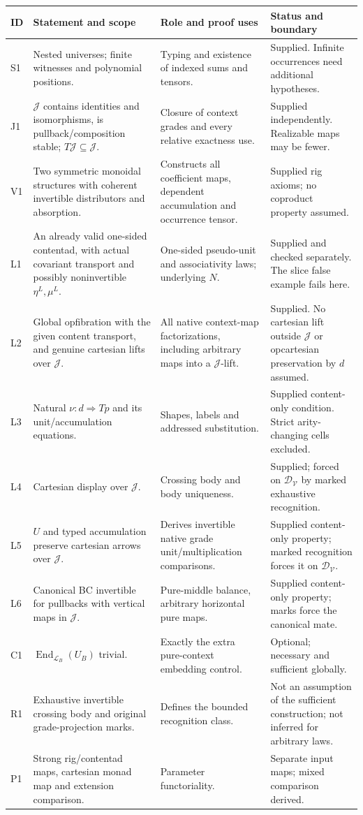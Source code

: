 \documentclass[11pt,a4paper]{article}
\theoremstyle{definition}
\newcommand{\V}{\mathcal V}
\newcommand{\Lcat}{\mathcal L}
\newcommand{\J}{\mathcal J}
\newcommand{\D}{\mathcal D_{\V}}
\newcommand{\End}{\operatorname{End}}
\begin{document}
\begin{longtable}{@{}p{.08\linewidth}p{.37\linewidth}p{.27\linewidth}p{.20\linewidth}@{}}
\toprule
ID&Statement and scope&Role and proof uses&Status and boundary\\
\midrule\endhead
S1&Nested universes; finite witnesses and polynomial positions.&Typing and
existence of indexed sums and tensors.&Supplied. Infinite occurrences need
additional hypotheses.\\
J1&$\J$ contains identities and isomorphisms, is pullback/composition stable;
$T\J\subseteq\J$.&Closure of context grades and every relative exactness use.&
Supplied independently. Realizable maps may be fewer.\\
V1&Two symmetric monoidal structures with coherent invertible distributors
and absorption.&Constructs all coefficient maps, dependent accumulation and
occurrence tensor.&Supplied rig axioms; no coproduct property assumed.\\
L1&An already valid one-sided contentad, with actual covariant transport and
possibly noninvertible $\eta^L,\mu^L$.&One-sided pseudo-unit and associativity
laws; underlying $N$.&Supplied and checked separately. The slice false
example fails here.\\
L2&Global opfibration with the given content transport, and genuine cartesian
lifts over $\J$.&All native context-map factorizations, including arbitrary
maps into a $\J$-lift.&Supplied. No cartesian lift outside $\J$ or
opcartesian preservation by $d$ assumed.\\
L3&Natural $\nu:d\Rightarrow Tp$ and its unit/accumulation equations.&Shapes,
labels and addressed substitution.&Supplied content-only condition. Strict
arity-changing cells excluded.\\
L4&Cartesian display over $\J$.&Crossing body and body uniqueness.&Supplied;
forced on $\D$ by marked exhaustive recognition.\\
L5&$U$ and typed accumulation preserve cartesian arrows over $\J$.&Derives
invertible native grade unit/multiplication comparisons.&Supplied
content-only property; marked recognition forces it on $\D$.\\
L6&Canonical BC invertible for pullbacks with vertical maps in $\J$.&Pure-middle
balance, arbitrary horizontal pure maps.&Supplied content-only property;
marks force the canonical mate.\\
C1&$\End_{\Lcat_B}(U_B)$ trivial.&Exactly the extra pure-context embedding
control.&Optional; necessary and sufficient globally.\\
R1&Exhaustive invertible crossing body and original grade-projection marks.&
Defines the bounded recognition class.&Not an assumption of the sufficient
construction; not inferred for arbitrary laws.\\
P1&Strong rig/contentad maps, cartesian monad map and extension comparison.&
Parameter functoriality.&Separate input maps; mixed comparison derived.\\
\bottomrule
\end{longtable}
\end{document}
